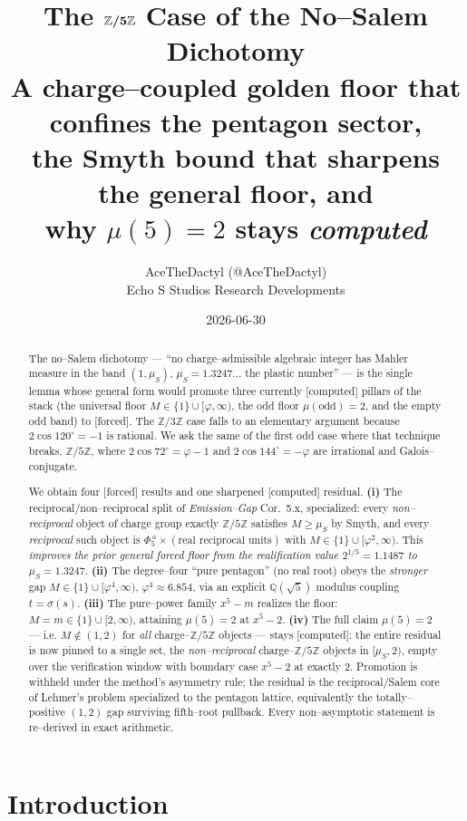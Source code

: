 \documentclass[11pt]{article}
\title{\textbf{The $\boldsymbol{\Zfive}$ Case of the No--Salem Dichotomy}\\[4pt]
\large A charge--coupled golden floor that confines the pentagon sector,\\
the Smyth bound that sharpens the general floor, and\\
why $\mu(5)=2$ stays \emph{computed}}
\author{AceTheDactyl (@AceTheDactyl)\\ Echo S Studios Research Developments}
\date{2026-06-30}
\newcommand{\forced}{\textcolor{cforced}{\textsf{[forced]}}}
\newcommand{\computed}{\textcolor{ccomp}{\textsf{[computed]}}}
\newcommand{\Z}{\mathbb{Z}}
\newcommand{\Q}{\mathbb{Q}}
\newcommand{\Mah}{M}
\newcommand{\muS}{\mu_S}
\newcommand{\Zfive}{\Z/5\Z}
\theoremstyle{plain}
\theoremstyle{definition}
\theoremstyle{remark}
\begin{document}
\maketitle

\begin{abstract}
\noindent
The no--Salem dichotomy --- ``no charge--admissible algebraic integer has Mahler measure in the
band $(1,\muS)$, $\muS=1.3247\ldots$ the plastic number'' --- is the single lemma whose general
form would promote three currently \computed{} pillars of the stack (the universal floor
$\Mah\in\{1\}\cup[\varphi,\infty)$, the odd floor $\mu(\text{odd})=2$, and the empty odd band)
to \forced{}. The $\Z/3\Z$ case falls to an elementary argument because $2\cos120^\circ=-1$ is
rational. We ask the same of the first odd case where that technique breaks, $\Zfive$, where
$2\cos72^\circ=\varphi-1$ and $2\cos144^\circ=-\varphi$ are irrational and Galois--conjugate.

We obtain four \forced{} results and one sharpened \computed{} residual.
\textbf{(i)} The reciprocal/non--reciprocal split of \emph{Emission--Gap} Cor.~5.x, specialized:
every \emph{non--reciprocal} object of charge group exactly $\Zfive$ satisfies $\Mah\ge\muS$ by
Smyth, and every \emph{reciprocal} such object is $\Phi_5^{\,a}\times(\text{real reciprocal units})$
with $\Mah\in\{1\}\cup[\varphi^2,\infty)$. This \emph{improves the prior general forced floor from
the realification value $2^{1/5}=1.1487$ to $\muS=1.3247$}. \textbf{(ii)} The degree--four ``pure
pentagon'' (no real root) obeys the \emph{stronger} gap $\Mah\in\{1\}\cup[\varphi^4,\infty)$,
$\varphi^4\approx6.854$, via an explicit $\Q(\sqrt5)$ modulus coupling $t=\sigma(s)$. \textbf{(iii)}
The pure--power family $x^5-m$ realizes the floor: $\Mah=m\in\{1\}\cup[2,\infty)$, attaining
$\mu(5)=2$ at $x^5-2$. \textbf{(iv)} The full claim $\mu(5)=2$ --- i.e. $\Mah\notin(1,2)$ for
\emph{all} charge--$\Zfive$ objects --- stays \computed{}: the entire residual is now pinned to a
single set, the \emph{non--reciprocal} charge--$\Zfive$ objects in $[\muS,2)$, empty over the
verification window with boundary case $x^5-2$ at exactly $2$. Promotion is withheld under the
method's asymmetry rule; the residual is the reciprocal/Salem core of Lehmer's problem specialized
to the pentagon lattice, equivalently the totally--positive $(1,2)$ gap surviving fifth--root
pullback. Every non--asymptotic statement is re--derived in exact arithmetic.
\end{abstract}

\section{Introduction}
\end{document}
